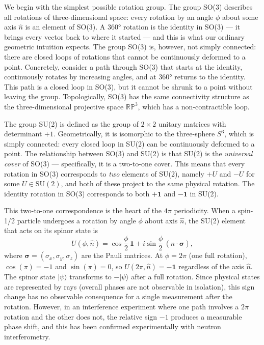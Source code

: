 \documentclass[%
 reprint,
 amsmath,amssymb,
 aps,
 prb,
]{revtex4-2}
\numberwithin{equation}{section}
\begin{document}
We begin with the simplest possible rotation group. The group SO(3) describes all rotations of three-dimensional space: every rotation by an angle $\phi$ about some axis $\hat{n}$ is an element of SO(3). A $360°$ rotation is the identity in SO(3) --- it brings every vector back to where it started --- and this is what our ordinary geometric intuition expects. The group SO(3) is, however, not simply connected: there are closed loops of rotations that cannot be continuously deformed to a point. Concretely, consider a path through SO(3) that starts at the identity, continuously rotates by increasing angles, and at $360°$ returns to the identity. This path is a closed loop in SO(3), but it cannot be shrunk to a point without leaving the group. Topologically, SO(3) has the same connectivity structure as the three-dimensional projective space $\mathbb{RP}^3$, which has a non-contractible loop.

The group SU(2) is defined as the group of $2\times 2$ unitary matrices with determinant $+1$. Geometrically, it is isomorphic to the three-sphere $S^3$, which is simply connected: every closed loop in SU(2) can be continuously deformed to a point. The relationship between SO(3) and SU(2) is that SU(2) is the \emph{universal cover} of SO(3) --- specifically, it is a two-to-one cover. This means that every rotation in SO(3) corresponds to \emph{two} elements of SU(2), namely $+U$ and $-U$ for some $U \in \mathrm{SU}(2)$, and both of these project to the same physical rotation. The identity rotation in SO(3) corresponds to both $+\mathbf{1}$ and $-\mathbf{1}$ in SU(2).

This two-to-one correspondence is the heart of the $4\pi$ periodicity. When a spin-1/2 particle undergoes a rotation by angle $\phi$ about axis $\hat{n}$, the SU(2) element that acts on its spinor state is
\begin{equation}
U(\phi, \hat{n}) = \cos\frac{\phi}{2}\,\mathbf{1} + i\sin\frac{\phi}{2}\,(\hat{n}\cdot\bm{\sigma}),
\label{eq:su2rotation}
\end{equation}
where $\bm{\sigma} = (\sigma_x, \sigma_y, \sigma_z)$ are the Pauli matrices. At $\phi = 2\pi$ (one full rotation), $\cos(\pi) = -1$ and $\sin(\pi) = 0$, so $U(2\pi, \hat{n}) = -\mathbf{1}$ regardless of the axis $\hat{n}$. The spinor state $|\psi\rangle$ transforms to $-|\psi\rangle$ after a full rotation. Since physical states are represented by rays (overall phases are not observable in isolation), this sign change has no observable consequence for a single measurement after the rotation. However, in an interference experiment where one path involves a $2\pi$ rotation and the other does not, the relative sign $-1$ produces a measurable phase shift, and this has been confirmed experimentally with neutron interferometry.
\end{document}
